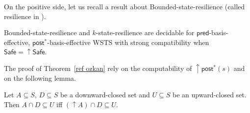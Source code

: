 \documentclass[runningheads]{llncs}
\newcommand{\alain}[1]{\todo[inline,color=red!20]{{\bf AF:} #1}}
\newcommand{\pred}{\textsf{pred}}
\newcommand{\post}{\textsf{post}}
\newcommand{\Safe}{\textsf{Safe}}
\begin{document}
On the positive side, let us recall a result about {\sc Bounded-state-resilience} (called resilience in \cite{DBLP:conf/gg/Ozkan22,DBLP:journals/corr/abs-2108-00889}).
%
%
\begin{theorem}\label{ref ozkan}
{\sc Bounded-state-resilience} and {\sc $k$-state-resilience} are decidable for $\pred$-basis-effective, $\post^*$-basis-effective WSTS with strong compatibility
when
$\Safe=\mathop{\uparrow} \Safe$.
\end{theorem}
%
%
%
%
%
The proof of Theorem~\ref{ref ozkan} rely on the computability of $\mathop{\uparrow} \post^*(s)$ and on the following lemma.

\begin{lemma}\label{Lemma intersection}
Let $A \subseteq S$, $D \subseteq S$ be a downward-closed set and $U \subseteq S$ be an upward-closed set. 
Then $A \cap D \subseteq U$  iff $ (\mathop{\uparrow}  A) \cap D \subseteq U$.
\end{lemma}

\end{document}
